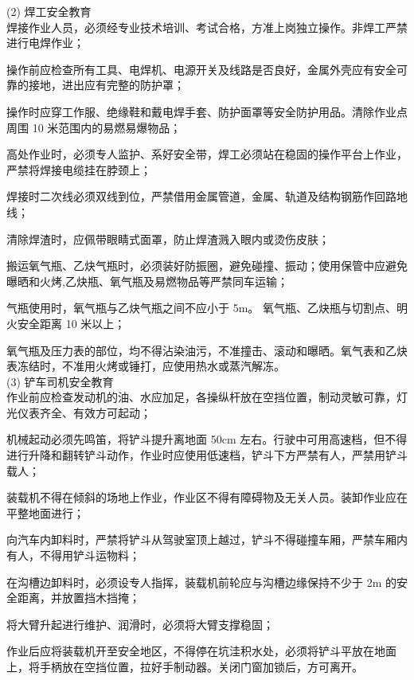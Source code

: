 (2) 焊工安全教育\\

 焊接作业人员，必须经专业技术培训、考试合格，方准上岗独立操作。非焊工严禁进行电焊作业；

 操作前应检查所有工具、电焊机、电源开关及线路是否良好，金属外壳应有安全可靠的接地，进出应有完整的防护罩；

 操作时应穿工作服、绝缘鞋和戴电焊手套、防护面罩等安全防护用品。清除作业点周围 10 米范围内的易燃易爆物品；

 高处作业时，必须专人监护、系好安全带，焊工必须站在稳固的操作平台上作业，严禁将焊接电缆挂在脖颈上；

 焊接时二次线必须双线到位，严禁借用金属管道，金属、轨道及结构钢筋作回路地线；

 清除焊渣时，应佩带眼睛式面罩，防止焊渣溅入眼内或烫伤皮肤；

 搬运氧气瓶、乙炔气瓶时，必须装好防振圈，避免碰撞、振动；使用保管中应避免曝晒和火烤,乙炔瓶、氧气瓶及易燃物品等严禁同车运输；

 气瓶使用时，氧气瓶与乙炔气瓶之间不应小于 5m。 氧气瓶、乙炔瓶与切割点、明火安全距离 10 米以上；

 氧气瓶及压力表的部位，均不得沾染油污，不准撞击、滚动和曝晒。氧气表和乙炔表冻结时，不准用火烤或锤打，应使用热水或蒸汽解冻。 \\

(3) 铲车司机安全教育\\

 作业前应检查发动机的油、水应加足，各操纵杆放在空挡位置，制动灵敏可靠，灯光仪表齐全、有效方可起动；

 机械起动必须先鸣笛，将铲斗提升离地面 50cm 左右。行驶中可用高速档，但不得进行升降和翻转铲斗动作，作业时应使用低速档，铲斗下方严禁有人，严禁用铲斗载人；

 装载机不得在倾斜的场地上作业，作业区不得有障碍物及无关人员。装卸作业应在平整地面进行；

 向汽车内卸料时，严禁将铲斗从驾驶室顶上越过，铲斗不得碰撞车厢，严禁车厢内有人，不得用铲斗运物料；

在沟槽边卸料时，必须设专人指挥，装载机前轮应与沟槽边缘保持不少于 2m 的安全距离，并放置挡木挡掩；

 将大臂升起进行维护、润滑时，必须将大臂支撑稳固；

 作业后应将装载机开至安全地区，不得停在坑洼积水处，必须将铲斗平放在地面上，将手柄放在空挡位置，拉好手制动器。关闭门窗加锁后，方可离开。\\

